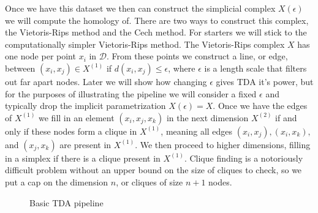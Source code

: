 \documentclass{article}
\begin{document}
Once we have this dataset we then can construct the simplicial complex $X(\epsilon)$ we will compute the homology of. There are two ways to construct this complex, the Vietoris-Rips method and the Cech method. For starters we will stick to the computationally simpler Vietoris-Rips method. The Vietoris-Rips complex $X$ has one node per point $x_i$ in $\mathcal{D}$. From these points we construct a line, or edge, between $(x_i, x_j) \in X^{(1)}$ if $d(x_i, x_j) \leq \epsilon$, where $\epsilon$ is a length scale that filters out far apart nodes. Later we will show how changing $\epsilon$ gives TDA it's power, but for the purposes of illustrating the pipeline we will consider a fixed $\epsilon$ and typically drop the implicit parametrization $X(\epsilon) = X$. Once we have the edges of $X^{(1)}$ we fill in an element $(x_i, x_j, x_k)$ in the next dimension $X^{(2)}$ if and only if these nodes form a clique in $X^{(1)}$, meaning all edges $(x_i, x_j), (x_i, x_k),$ and $(x_j, x_k)$ are present in $X^{(1)}$. We then proceed to higher dimensions, filling in a simplex if there is a clique present in $X^{(1)}$. Clique finding is a notoriously difficult problem without an upper bound on the size of cliques to check, so we put a cap on the dimension $n$, or cliques of size $n + 1$ nodes.

\begin{figure}
    \centering
    \caption{Basic TDA pipeline}
    \label{fig:enter-label}
\end{figure}
\end{document}
